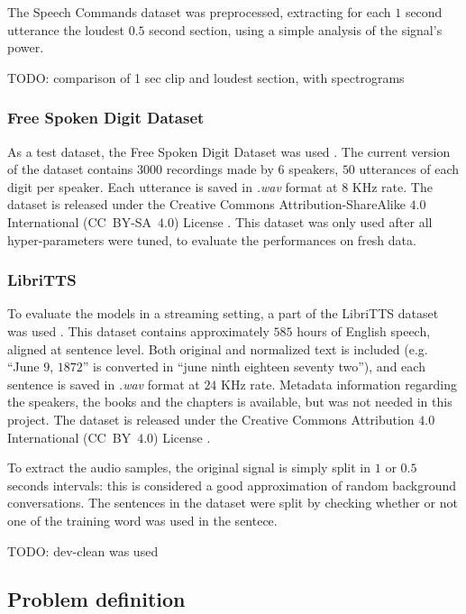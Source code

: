 The Speech Commands dataset was preprocessed, extracting for each $1$ second
utterance the loudest $0.5$ second section, using a simple analysis of the
signal's power.

TODO: comparison of 1 sec clip and loudest section, with spectrograms

\subsubsection{Free Spoken Digit Dataset}

As a test dataset, the Free Spoken Digit Dataset was used
\cite{zohar_jackson_2018_1342401}.
The current version of the dataset contains $3000$ recordings made by $6$
speakers, $50$ utterances of each digit per speaker.
Each utterance is saved in \textit{.wav} format at $8$ KHz rate.
The dataset is released under the Creative Commons 
Attribution-ShareAlike $4.0$ International (CC~BY-SA~$4.0$)
License \cite{ccbysa4}.
This dataset was only used after all hyper-parameters were tuned, to evaluate
the performances on fresh data.

\subsubsection{LibriTTS}

To evaluate the models in a streaming setting,
a part of the LibriTTS dataset was used \cite{zen2019libritts}.
This dataset contains approximately $585$ hours of English speech, aligned at
sentence level.
Both original and normalized text is included (e.g. ``June $9$, $1872$'' is
converted in ``june ninth eighteen seventy two''), and each sentence is saved
in \textit{.wav} format at $24$ KHz rate.
Metadata information regarding the speakers, the books and the chapters is
available, but was not needed in this project.
The dataset is released under the Creative Commons Attribution $4.0$
International (CC~BY~$4.0$) License \cite{ccby4}.

To extract the audio samples, the original signal is simply split in $1$ or
$0.5$ seconds intervals: this is considered a good approximation of random
background conversations.
The sentences in the dataset were split by checking whether or not
one of the training word was used in the sentece.

TODO: dev-clean was used

\subsection{Problem definition}

